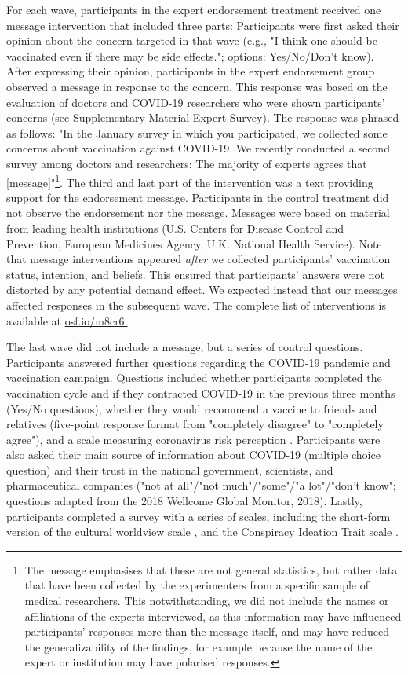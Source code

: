 \documentclass[authordate, empirical]{jote-new-article}
\begin{document}
	For each wave, participants in the expert endorsement treatment received one message intervention that included three parts: Participants were first asked their opinion about the concern targeted in that wave (e.g., "I think one should be vaccinated even if there may be side effects."; options: Yes/No/Don't know). After expressing their opinion, participants in the expert endorsement group observed a message in response to the concern. This response was based on the evaluation of doctors and COVID-19 researchers who were shown participants' concerns (see Supplementary Material Expert Survey). The response was phrased as follows: "In the January survey in which you participated, we collected some concerns about vaccination against COVID-19. We recently conducted a second survey among doctors and researchers: The majority of experts agrees that [message]"\footnote{ The message emphasises that these are not general statistics, but rather data that have been collected by the experimenters from a specific sample of medical researchers. This notwithstanding, we did not include the names or affiliations of the experts interviewed, as this information may have influenced participants' responses more than the message itself, and may have reduced the generalizability of the findings, for example because the name of the expert or institution may have polarised responses.}. The third and last part of the intervention was a text providing support for the endorsement message. Participants in the control treatment did not observe the endorsement nor the message. Messages were based on material from leading health institutions (U.S. Centers for Disease Control and Prevention, European Medicines Agency, U.K. National Health Service). Note that message interventions appeared \emph{after }we collected participants' vaccination status, intention, and beliefs. This ensured that participants' answers were not distorted by any potential demand effect. We expected instead that our messages affected responses in the subsequent wave. The complete list of interventions is available at \href{https://osf.io/m8cr6/}{osf.io/m8cr6.}



	The last wave did not include a message, but a series of control questions. Participants answered further questions regarding the COVID-19 pandemic and vaccination campaign. Questions included whether participants completed the vaccination cycle and if they contracted COVID-19 in the previous three months (Yes/No questions), whether they would recommend a vaccine to friends and relatives (five-point response format from "completely disagree" to "completely agree"), and a scale measuring coronavirus risk perception \parencites{Savadori2021}. Participants were also asked their main source of information about COVID-19 (multiple choice question) and their trust in the national government, scientists, and pharmaceutical companies ("not at all"/"not much"/"some"/"a lot"/"don't know"; questions adapted from the 2018 Wellcome Global Monitor, 2018). Lastly, participants completed a survey with a series of scales, including the short-form version of the cultural worldview scale \parencites{Kahan2012}, and the Conspiracy Ideation Trait scale \parencites{Bode2018}.
\end{document}
